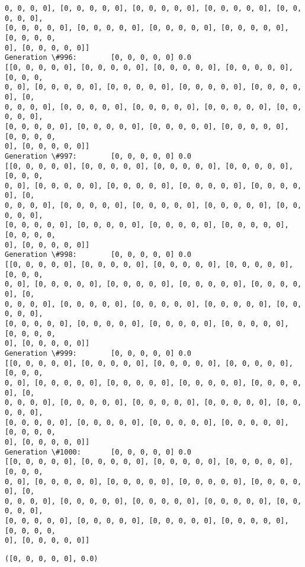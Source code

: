 \documentclass[11pt]{article}
\makeatletter
\newcommand{\boxspacing}{\kern\kvtcb@left@rule\kern\kvtcb@boxsep}
\newcommand{\prompt}[4]{
        \ttfamily\llap{{\color{#2}[#3]:\hspace{3pt}#4}}\vspace{-\baselineskip}
    }
\makeatother
\begin{document}
\begin{Verbatim}[commandchars=\\\{\}]
0, 0, 0, 0], [0, 0, 0, 0, 0], [0, 0, 0, 0, 0], [0, 0, 0, 0, 0], [0, 0, 0, 0, 0],
[0, 0, 0, 0, 0], [0, 0, 0, 0, 0], [0, 0, 0, 0, 0], [0, 0, 0, 0, 0], [0, 0, 0, 0,
0], [0, 0, 0, 0, 0]]
Generation \#996:        [0, 0, 0, 0, 0] 0.0
[[0, 0, 0, 0, 0], [0, 0, 0, 0, 0], [0, 0, 0, 0, 0], [0, 0, 0, 0, 0], [0, 0, 0,
0, 0], [0, 0, 0, 0, 0], [0, 0, 0, 0, 0], [0, 0, 0, 0, 0], [0, 0, 0, 0, 0], [0,
0, 0, 0, 0], [0, 0, 0, 0, 0], [0, 0, 0, 0, 0], [0, 0, 0, 0, 0], [0, 0, 0, 0, 0],
[0, 0, 0, 0, 0], [0, 0, 0, 0, 0], [0, 0, 0, 0, 0], [0, 0, 0, 0, 0], [0, 0, 0, 0,
0], [0, 0, 0, 0, 0]]
Generation \#997:        [0, 0, 0, 0, 0] 0.0
[[0, 0, 0, 0, 0], [0, 0, 0, 0, 0], [0, 0, 0, 0, 0], [0, 0, 0, 0, 0], [0, 0, 0,
0, 0], [0, 0, 0, 0, 0], [0, 0, 0, 0, 0], [0, 0, 0, 0, 0], [0, 0, 0, 0, 0], [0,
0, 0, 0, 0], [0, 0, 0, 0, 0], [0, 0, 0, 0, 0], [0, 0, 0, 0, 0], [0, 0, 0, 0, 0],
[0, 0, 0, 0, 0], [0, 0, 0, 0, 0], [0, 0, 0, 0, 0], [0, 0, 0, 0, 0], [0, 0, 0, 0,
0], [0, 0, 0, 0, 0]]
Generation \#998:        [0, 0, 0, 0, 0] 0.0
[[0, 0, 0, 0, 0], [0, 0, 0, 0, 0], [0, 0, 0, 0, 0], [0, 0, 0, 0, 0], [0, 0, 0,
0, 0], [0, 0, 0, 0, 0], [0, 0, 0, 0, 0], [0, 0, 0, 0, 0], [0, 0, 0, 0, 0], [0,
0, 0, 0, 0], [0, 0, 0, 0, 0], [0, 0, 0, 0, 0], [0, 0, 0, 0, 0], [0, 0, 0, 0, 0],
[0, 0, 0, 0, 0], [0, 0, 0, 0, 0], [0, 0, 0, 0, 0], [0, 0, 0, 0, 0], [0, 0, 0, 0,
0], [0, 0, 0, 0, 0]]
Generation \#999:        [0, 0, 0, 0, 0] 0.0
[[0, 0, 0, 0, 0], [0, 0, 0, 0, 0], [0, 0, 0, 0, 0], [0, 0, 0, 0, 0], [0, 0, 0,
0, 0], [0, 0, 0, 0, 0], [0, 0, 0, 0, 0], [0, 0, 0, 0, 0], [0, 0, 0, 0, 0], [0,
0, 0, 0, 0], [0, 0, 0, 0, 0], [0, 0, 0, 0, 0], [0, 0, 0, 0, 0], [0, 0, 0, 0, 0],
[0, 0, 0, 0, 0], [0, 0, 0, 0, 0], [0, 0, 0, 0, 0], [0, 0, 0, 0, 0], [0, 0, 0, 0,
0], [0, 0, 0, 0, 0]]
Generation \#1000:       [0, 0, 0, 0, 0] 0.0
[[0, 0, 0, 0, 0], [0, 0, 0, 0, 0], [0, 0, 0, 0, 0], [0, 0, 0, 0, 0], [0, 0, 0,
0, 0], [0, 0, 0, 0, 0], [0, 0, 0, 0, 0], [0, 0, 0, 0, 0], [0, 0, 0, 0, 0], [0,
0, 0, 0, 0], [0, 0, 0, 0, 0], [0, 0, 0, 0, 0], [0, 0, 0, 0, 0], [0, 0, 0, 0, 0],
[0, 0, 0, 0, 0], [0, 0, 0, 0, 0], [0, 0, 0, 0, 0], [0, 0, 0, 0, 0], [0, 0, 0, 0,
0], [0, 0, 0, 0, 0]]
    \end{Verbatim}

            \begin{tcolorbox}[breakable, size=fbox, boxrule=.5pt, pad at break*=1mm, opacityfill=0]
\prompt{Out}{outcolor}{13}{\boxspacing}
\begin{Verbatim}[commandchars=\\\{\}]
([0, 0, 0, 0, 0], 0.0)
\end{Verbatim}
\end{tcolorbox}
        
    \begin{tcolorbox}[breakable, size=fbox, boxrule=1pt, pad at break*=1mm,colback=cellbackground, colframe=cellborder]
\prompt{In}{incolor}{ }{\boxspacing}
\begin{Verbatim}[commandchars=\\\{\}]

\end{Verbatim}
\end{tcolorbox}


    
    
    
\end{document}
